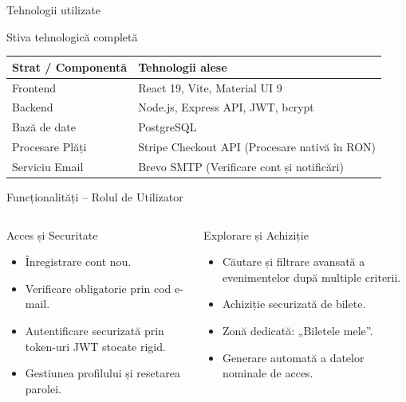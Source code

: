 \documentclass[aspectratio=169,12pt]{beamer}
\begin{document}
	\begin{frame}{Tehnologii utilizate}
		\begin{block}{Stiva tehnologică completă}
			\centering
			\vspace{0.1cm}
			\begin{tabular}{@{}ll@{}}
				\toprule
				\textbf{Strat / Componentă} & \textbf{Tehnologii alese} \\
				\midrule
				Frontend & React 19, Vite, Material UI 9 \\
				Backend & Node.js, Express API, JWT, bcrypt \\
				Bază de date & PostgreSQL \\
				Procesare Plăți & Stripe Checkout API (Procesare nativă în RON) \\
				Serviciu Email & Brevo SMTP (Verificare cont și notificări) \\
				\bottomrule
			\end{tabular}
		\end{block}
	\end{frame}
	
	\begin{frame}{Funcționalități -- Rolul de Utilizator}
		\begin{columns}[T]
			\begin{block}{Acces și Securitate}
				\begin{itemize}
					\item Înregistrare cont nou.
					\item Verificare obligatorie prin cod e-mail.
					\item Autentificare securizată prin token-uri JWT stocate rigid.
					\item Gestiunea profilului și resetarea parolei.
				\end{itemize}
			\end{block}
			\begin{block}{Explorare și Achiziție}
				\begin{itemize}
					\item Căutare și filtrare avansată a evenimentelor după multiple criterii.
					\item Achiziție securizată de bilete.
					\item Zonă dedicată: „Biletele mele”.
					\item Generare automată a datelor nominale de acces.
				\end{itemize}
			\end{block}
		\end{columns}
	\end{frame}
	
\end{document}

